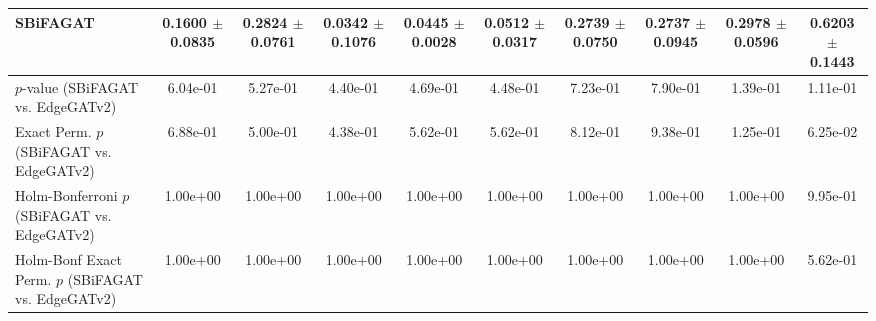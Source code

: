 \begin{table}[t]
{\begin{tabular}{lccccccccc}
SBiFAGAT & 0.1600 $\pm$ 0.0835 & 0.2824 $\pm$ 0.0761 & 0.0342 $\pm$ 0.1076 & \textbf{0.0445 $\pm$ 0.0028} & \textbf{0.0512 $\pm$ 0.0317} & 0.2739 $\pm$ 0.0750 & 0.2737 $\pm$ 0.0945 & \textbf{0.2978 $\pm$ 0.0596} & \textbf{0.6203 $\pm$ 0.1443} \\
\midrule
$p$-value (SBiFAGAT vs. EdgeGATv2) & 6.04e-01 & 5.27e-01 & 4.40e-01 & 4.69e-01 & 4.48e-01 & 7.23e-01 & 7.90e-01 & 1.39e-01 & 1.11e-01 \\
Exact Perm. $p$ (SBiFAGAT vs. EdgeGATv2) & 6.88e-01 & 5.00e-01 & 4.38e-01 & 5.62e-01 & 5.62e-01 & 8.12e-01 & 9.38e-01 & 1.25e-01 & 6.25e-02 \\
Holm-Bonferroni $p$ (SBiFAGAT vs. EdgeGATv2) & 1.00e+00 & 1.00e+00 & 1.00e+00 & 1.00e+00 & 1.00e+00 & 1.00e+00 & 1.00e+00 & 1.00e+00 & 9.95e-01 \\
Holm-Bonf Exact Perm. $p$ (SBiFAGAT vs. EdgeGATv2) & 1.00e+00 & 1.00e+00 & 1.00e+00 & 1.00e+00 & 1.00e+00 & 1.00e+00 & 1.00e+00 & 1.00e+00 & 5.62e-01 \\
\bottomrule
\end{tabular}
}
\end{table}
